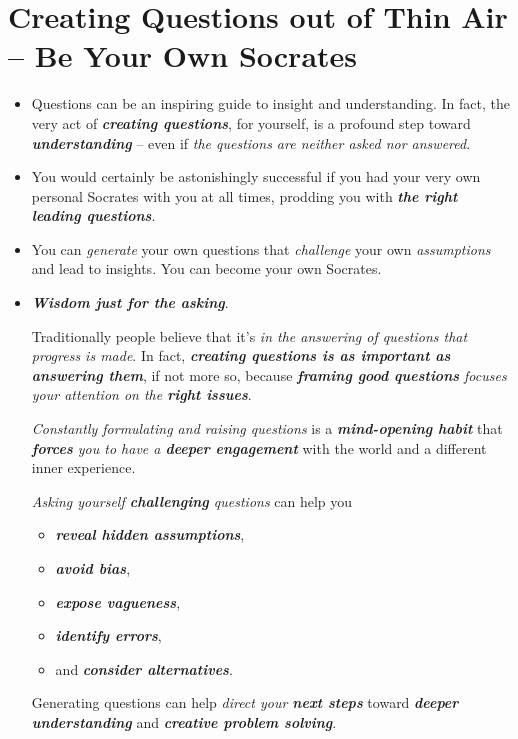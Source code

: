\documentclass[11pt]{article}
\begin{document}
\section{Creating Questions out of Thin Air -- Be Your Own Socrates}
\begin{itemize}
\item Questions can be an inspiring guide to insight and understanding. In fact, the very act of \emph{\textbf{creating questions}}, for yourself, is a profound step toward \emph{\textbf{understanding}} -- even if \emph{the questions are neither asked nor answered}.

\item You would certainly be astonishingly successful if you had your very own personal Socrates with you at all times, prodding you with \emph{\textbf{the right leading questions}}. 

\item You can \emph{generate} your own questions that \emph{challenge} your own \emph{assumptions} and lead to insights. You can become your own Socrates.

\item \emph{\textbf{Wisdom just for the asking}}.

Traditionally people believe that it’s \emph{in the answering of questions that progress is made}. In fact, \emph{\textbf{creating questions is as important as answering them}}, if not more so, because \emph{\textbf{framing good questions} focuses your attention on the \textbf{right issues}}. 

\emph{Constantly formulating and raising questions} is a \emph{\textbf{mind-opening habit}} that \emph{\textbf{forces} you to have a \textbf{deeper engagement}} with the world and a different inner experience. 

\emph{Asking yourself \textbf{challenging} questions} can help you 
\begin{itemize}
\item \emph{\textbf{reveal hidden assumptions}}, 
\item \emph{\textbf{avoid bias}}, 
\item \emph{\textbf{expose vagueness}},
\item \emph{\textbf{identify errors}}, 
\item  and \emph{\textbf{consider alternatives}}. 
\end{itemize} Generating questions can help \emph{direct your \textbf{next steps}} toward \emph{\textbf{deeper understanding}} and \emph{\textbf{creative problem solving}}.
\end{itemize}
\end{document}
